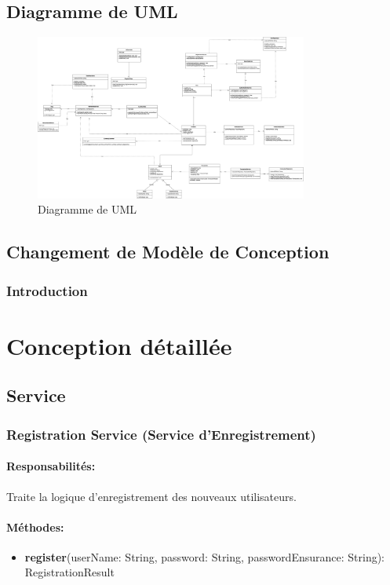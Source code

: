 \documentclass{article}
\begin{document}
\subsection{Diagramme de UML}
\begin{figure}[h]
    \centering
    \includegraphics[width=0.8\textwidth]{../analysises/UML/V1.0/UMLV1.4.png}
    \caption{Diagramme de UML}
    \label{fig:UML}
\end{figure}

\subsection{Changement de Modèle de Conception}
\subsubsection{Introduction}




\section{Conception détaillée}
\subsection{Service}
\subsubsection{Registration Service (Service d'Enregistrement)}
\paragraph{Responsabilités:} Traite la logique d'enregistrement des nouveaux utilisateurs.
\paragraph{Méthodes:}
\begin{itemize}
  \item \textbf{register}(userName: String, password: String, passwordEnsurance: String): RegistrationResult
\end{itemize}
\end{document}
